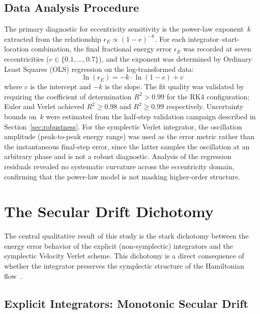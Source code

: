 \documentclass[twocolumn, 10pt]{article}
\begin{document}
\subsection{Data Analysis Procedure}

The primary diagnostic for eccentricity sensitivity is the power-law exponent~$k$ extracted from the relationship $\epsilon_E \propto (1-e)^{-k}$. For each integrator--start-location combination, the final fractional energy error $\epsilon_E$ was recorded at seven eccentricities ($e \in \{0.1, \ldots, 0.7\}$), and the exponent was determined by Ordinary Least Squares (OLS) regression on the log-transformed data:
\begin{equation}
\ln(\epsilon_E) = -k \cdot \ln(1-e) + c
\label{eq:ols}
\end{equation}
where $c$ is the intercept and $-k$ is the slope. The fit quality was validated by requiring the coefficient of determination $R^2 > 0.99$ for the RK4 configuration; Euler and Verlet achieved $R^2 \geq 0.98$ and $R^2 \geq 0.99$ respectively. Uncertainty bounds on~$k$ were estimated from the half-step validation campaign described in Section~\ref{sec:robustness}. For the symplectic Verlet integrator, the oscillation amplitude (peak-to-peak energy range) was used as the error metric rather than the instantaneous final-step error, since the latter samples the oscillation at an arbitrary phase and is not a robust diagnostic. Analysis of the regression residuals revealed no systematic curvature across the eccentricity domain, confirming that the power-law model is not masking higher-order structure.

\section{The Secular Drift Dichotomy}

The central qualitative result of this study is the stark dichotomy between the energy error behavior of the explicit (non-symplectic) integrators and the symplectic Velocity Verlet scheme. This dichotomy is a direct consequence of whether the integrator preserves the symplectic structure of the Hamiltonian flow~\cite{kinoshita1991, rein2019}.

\subsection{Explicit Integrators: Monotonic Secular Drift}
\end{document}
